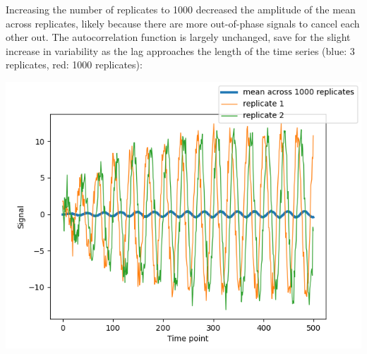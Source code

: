 \begin{enumerate}
\begin{enumerate}
\begin{enumerate}
Increasing the number of replicates to 1000 decreased the amplitude of the mean across replicates, likely because there are more out-of-phase signals to cancel each other out.  The autocorrelation function is largely unchanged, save for the slight increase in variability as the lag approaches the length of the time series (blue: 3 replicates, red: 1000 replicates):
\begin{center}
\includegraphics[width=.9\linewidth]{nonstat_kmax10_randphase_1000rep_mean.png}
\end{center}


\end{enumerate}
\end{enumerate}
\end{enumerate}
